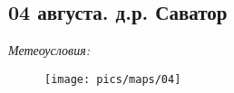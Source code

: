 \subsection{04 августа. д.р. Саватор}
\textit{Метеоусловия: }

\begin{figure}[h!]
	\centering
	\texttt{[image: pics/maps/04]}
	\label{fig:04}
\end{figure}



\clearpage